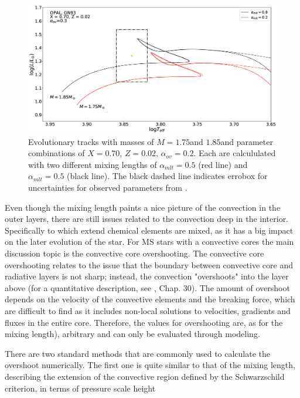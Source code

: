 \begin{figure}[htbp]
    \centering
    \includegraphics[width=1\textwidth]{mlt.eps}
    \caption{Evolutionary tracks with masses of $M=1.75$\msun and $1.85$\msun and parameter combinations of $X=0.70$, $Z=0.02$, $\alpha_{ov}=0.2$. Each are calcululated with two different mixing lengths of $\alpha_{mlt}=0.5$ (red line) and $\alpha_{mlt}=0.5$ (black line). The black dashed line indicates errobox for uncertainties for observed parameters from \citet{lenz2010delta}.}
    \label{mlt}
\end{figure}

Even though the mixing length paints a nice picture of the convection in the outer layers, there are still issues related to the convection deep in the interior. Specifically to which extend chemical elements are mixed, as it has a big impact on the later evolution of the star. For MS stars with a convective cores the main discussion topic is the convective core overshooting. The convective core overshooting relates to the issue that the boundary between convective core and radiative layers is not sharp; instead, the convection "overshoots" into the layer above (for a quantitative description, see \citet{kippenhahn1990stellar}, Chap. 30). The amount of overshoot depends on the velocity of the convective elements and the breaking force, which are difficult to find as it includes non-local solutions to velocities, gradients and fluxes in the entire core. Therefore, the values for overshooting are, as for the mixing length), arbitrary and can only be evaluated through modeling. 

There are two standard methods that are commonly used to calculate the overshoot numerically. The first one is quite similar to that of the mixing length, describing the extension of the convective region defined by the Schwarzschild criterion, in terms of pressure scale height

